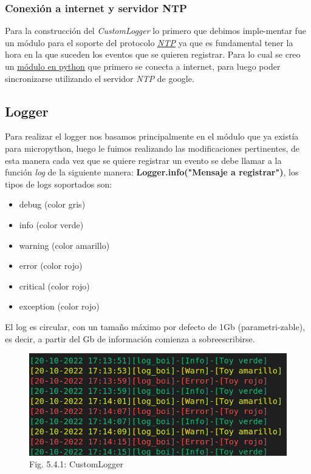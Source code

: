 \documentclass[12pt]{article}
\begin{document}
\subsubsection{Conexión a internet y servidor NTP}
Para la construcción del \textit{CustomLogger} lo primero que debimos imple-mentar fue un módulo para el soporte del protocolo \href{https://es.wikipedia.org/wiki/Network_Time_Protocol}{\textit{NTP}} \cite{ntp} ya que es fundamental tener la hora en la que suceden los eventos que se quieren registrar. Para lo cual se creo un \href{https://github.com/sofia-am/DJI_Payload_Development/blob/main/log/micropython/lib/us_ntp.py}{módulo en python} \cite{repo} que primero se conecta a internet, para luego poder sincronizarse utilizando el servidor \textit{NTP} de google.

\subsection{Logger}
Para realizar el logger nos basamos principalmente en el módulo que ya existía para micropython, luego le fuimos realizando las modificaciones pertinentes, de esta manera cada vez que se quiere registrar un evento se debe llamar a la función \textit{log} de la siguiente manera: \textbf{Logger.info("Mensaje a registrar")}, los tipos de logs soportados son:
\begin{itemize}
  \item debug (color gris)
  \item info (color verde)
  \item warning (color amarillo)
  \item error (color rojo)
  \item critical (color rojo)
  \item exception (color rojo)
\end{itemize}
El log es circular, con un tamaño máximo por defecto de 1Gb (parametri-zable), es decir, a partir del Gb de información comienza a sobreescribirse.

\begin{figure}
  \begin{center}
    \includegraphics[scale=0.5]{images/PyCom-Logger.png}
    \caption{Fig. 5.4.1: CustomLogger}
  \end{center}
\end{figure}
\end{document}
